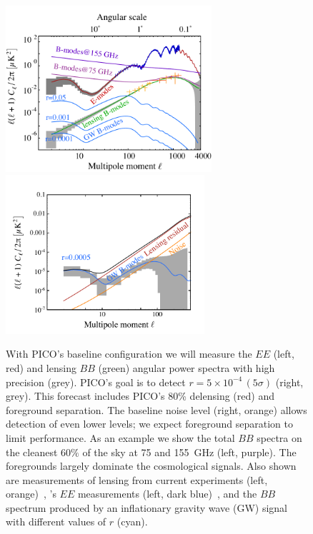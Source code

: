 \documentclass[PICOReport.tex]{subfiles}
\begin{document}
\begin{figure}[!thb]
\centering
\vspace{-0.05in}
\hspace{-0.15in}
\includegraphics[width=3in]{images/cmb_powspec_PICOv4p1_v2.pdf}
\includegraphics[width=2.9in,trim= 0cm 0.2cm 0cm 0cm]{images/cmbbb_powspec_PICOv4p1.pdf}
\vspace{-0.1in}
\caption{\captiontext With PICO's baseline configuration we will measure the $EE$ (left, red) and lensing $BB$ (green) angular power spectra with high precision (grey). PICO's goal is to detect $r= 5\times 10^{-4}\, (5\sigma)$ (right, grey). This forecast includes PICO's 80\% delensing (red) and foreground separation. The baseline noise level (right, orange) allows detection of even lower levels; we expect foreground separation to limit performance.  As an example we show the total $BB$ spectra on the cleanest $60\%$ of the sky at 75 and 155~GHz (left, purple). The foregrounds largely dominate the cosmological signals. Also shown are measurements of lensing from current experiments (left, orange)~\citep{PB_BB, keisler2015, actpol_lensing_BB, Array:2015xqh}, \planck 's $EE$ measurements (left, dark blue)~\citep{Planck2018_I}, and the $BB$ spectrum produced by an inflationary gravity wave (GW) signal with different values of $r$ (cyan). 
\label{fig:clbb} }
\vspace{-0.05in}
\end{figure}
\end{document}

